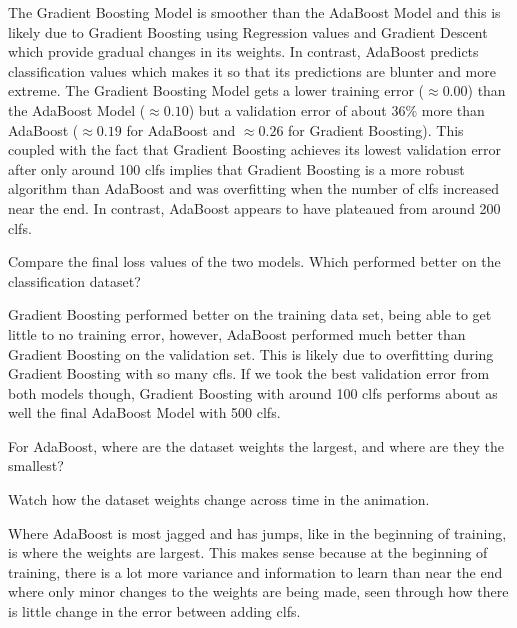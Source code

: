 \begin{solution}
  The Gradient Boosting Model is smoother than the AdaBoost Model and this is likely due to Gradient Boosting using Regression values and Gradient Descent which provide gradual changes in its weights. In contrast, AdaBoost predicts classification values which makes it so that its predictions are blunter and more extreme. The Gradient Boosting Model gets a lower training error ($\approx 0.00$) than the AdaBoost Model ($\approx 0.10$) but a validation error of about $36\%$ more than AdaBoost ($\approx 0.19$ for AdaBoost and $\approx 0.26$ for Gradient Boosting). This coupled with the fact that Gradient Boosting achieves its lowest validation error after only around 100 clfs implies that Gradient Boosting is a more robust algorithm than AdaBoost and was overfitting when the number of clfs increased near the end. In contrast, AdaBoost appears to have plateaued from around 200 clfs.
\end{solution}

\begin{problem}[2]
    Compare the final loss values of the two models. Which performed better on the classification dataset?
\end{problem}

\begin{solution}
    Gradient Boosting performed better on the training data set, being able to get little to no training error, however, AdaBoost performed much better than Gradient Boosting on the validation set. This is likely due to overfitting during Gradient Boosting with so many cfls. If we took the best validation error from both models though, Gradient Boosting with around 100 clfs performs about as well the final AdaBoost Model with 500 clfs.
\end{solution}

\begin{problem}[2]
    For AdaBoost, where are the dataset weights the largest, and where are they the smallest?
\end{problem}
\begin{hint}
    Watch how the dataset weights change across time in the animation.
\end{hint}
\begin{solution}
   Where AdaBoost is most jagged and has jumps, like in the beginning of training, is where the weights are largest. This makes sense because at the beginning of training, there is a lot more variance and information to learn than near the end where only minor changes to the weights are being made, seen through how there is little change in the error between adding clfs.
\end{solution}

